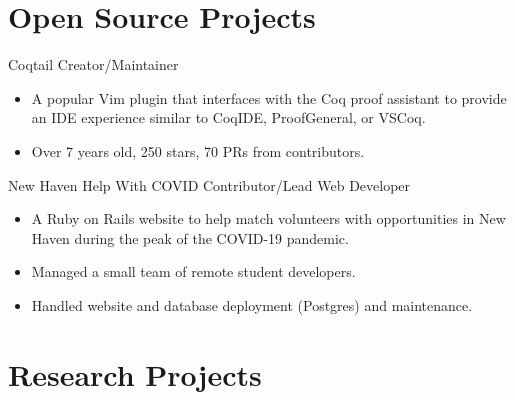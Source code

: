 \documentclass[10pt,letterpaper,sans]{moderncv}
\begin{document}
\section{Open Source Projects}

        {Coqtail}
        {Creator/Maintainer}
        {}
        {}
        {%
          \begin{itemize}
            \item
              A popular Vim plugin that interfaces with the Coq proof assistant
              to provide an IDE experience similar to CoqIDE, ProofGeneral, or VSCoq.
            \item
              Over 7 years old, 250\ormore{} stars, \about{}70 PRs from contributors.
          \end{itemize}
        }
        {New Haven Help With COVID}
        {Contributor/Lead Web Developer}
        {}
        {}
        {%
          \begin{itemize}
            \item
              A Ruby on Rails website to help match volunteers with
              opportunities in New Haven during the peak of the COVID-19 pandemic.
            \item
              Managed a small team of remote student developers.
            \item
              Handled website and database deployment (Postgres) and maintenance.
          \end{itemize}
        }

\section{Research Projects}
\end{document}
